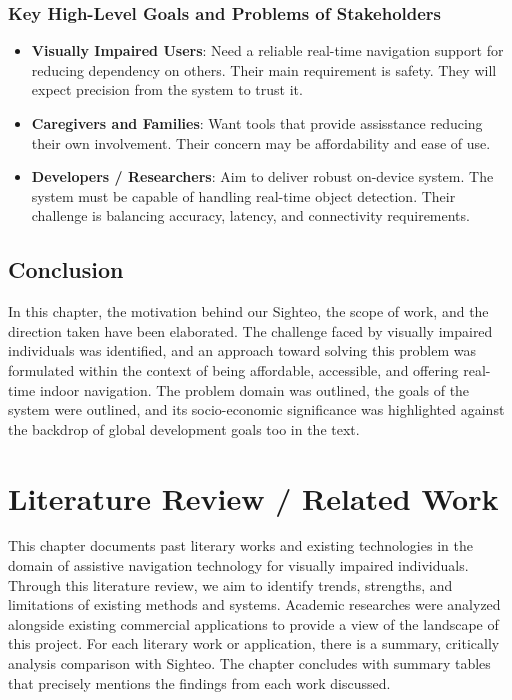 \documentclass{FastFyp}
\begin{document}
\subsection{Key High-Level Goals and Problems of Stakeholders}
\begin{itemize}
    \item \textbf{Visually Impaired Users}: Need a reliable real-time navigation support for reducing dependency on others. Their main requirement is safety. They will expect precision from the system to trust it.
    \item \textbf{Caregivers and Families}: Want tools that provide assisstance reducing their own involvement. Their concern may be affordability and ease of use.
    \item \textbf{Developers / Researchers}: Aim to deliver robust on-device system. The system must be capable of handling real-time object detection. Their challenge is balancing accuracy, latency, and connectivity requirements.
\end{itemize}

\section{Conclusion}
In this chapter, the motivation behind our Sighteo, the scope of work, and the direction taken have been elaborated. The challenge faced by visually impaired individuals was identified, and an approach toward solving this problem was formulated within the context of being affordable, accessible, and offering real-time indoor navigation. The problem domain was outlined, the goals of the system were outlined, and its socio-economic significance was highlighted against the backdrop of global development goals too in the text.

\chapter{Literature Review / Related Work}
This chapter documents past literary works and existing technologies in the domain of assistive navigation technology for visually impaired individuals. Through this literature review, we aim to identify trends, strengths, and limitations of existing methods and systems. Academic researches were analyzed alongside existing commercial applications to provide a view of the landscape of this project. For each literary work or application, there is a summary, critically analysis comparison with Sighteo. The chapter concludes with summary tables that precisely mentions the findings from each work discussed.
\end{document}
